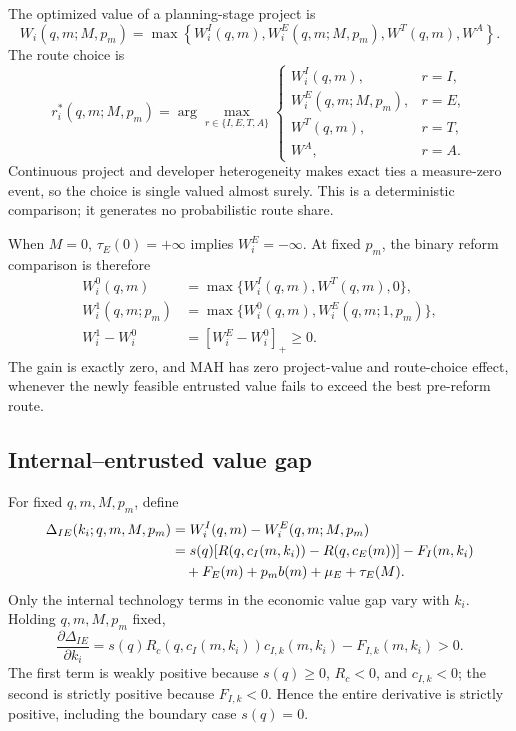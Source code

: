 The optimized value of a planning-stage project is
\begin{equation}
  W_i(q,m;M,p_m)
  =
  \max\left\{
    W_i^I(q,m),
    W_i^E(q,m;M,p_m),
    W^T(q,m),
    W^A
  \right\}.
  \label{eq:p04-optimized-value}
\end{equation}
The route choice is
\begin{equation}
  r_i^*(q,m;M,p_m)
  =
  \arg\max_{r\in\{I,E,T,A\}}
  \begin{cases}
    W_i^I(q,m), & r=I,\\
    W_i^E(q,m;M,p_m), & r=E,\\
    W^T(q,m), & r=T,\\
    W^A, & r=A.
  \end{cases}
  \label{eq:p04-route-choice}
\end{equation}
Continuous project and developer heterogeneity makes exact ties a
measure-zero event, so the choice is single valued almost surely. This is a
deterministic comparison; it generates no probabilistic route share.

When \(M=0\), \(\tau_E(0)=+\infty\) implies
\(W_i^E=-\infty\).
At fixed \(p_m\), the binary reform comparison is therefore
\begin{equation}
  \begin{aligned}
  W_i^0(q,m)
  &=\max\{W_i^I(q,m),W^T(q,m),0\},\\
  W_i^1(q,m;p_m)
  &=\max\{W_i^0(q,m),W_i^E(q,m;1,p_m)\},\\
  W_i^1-W_i^0
  &=[W_i^E-W_i^0]_+\geq0.
  \end{aligned}
  \label{eq:p04-binary-value-effect}
\end{equation}
The gain is exactly zero, and MAH has zero project-value and route-choice
effect, whenever the newly
feasible entrusted value fails to exceed the best pre-reform route.

\subsection{Internal--entrusted value gap}
\label{subsec:p04-value-gap}

For fixed \(q,m,M,p_m\), define
\begin{align}
  \Delta_{IE}(k_i;q,m,M,p_m)
  &=
  W_i^I(q,m)-W_i^E(q,m;M,p_m) \notag\\
  &=
  s(q)\!\left[
    R\!\left(q,c_I(m,k_i)\right)
    -R\!\left(q,c_E(m)\right)
  \right]
  -F_I(m,k_i) \notag\\
  &\quad
  +F_E(m)+p_m b(m)+\mu_E+\tau_E(M).
  \label{eq:p04-value-gap}
\end{align}
Only the internal technology terms in the economic value gap vary with \(k_i\).
Holding \(q,m,M,p_m\) fixed,
\begin{equation}
  \frac{\partial\Delta_{IE}}{\partial k_i}
  =
  s(q)R_c\!\left(q,c_I(m,k_i)\right)c_{I,k}(m,k_i)
  -
  F_{I,k}(m,k_i)
  >0.
  \label{eq:p04-gap-slope}
\end{equation}
The first term is weakly positive because \(s(q)\geq0\),
\(R_c<0\), and \(c_{I,k}<0\); the second is strictly positive because
\(F_{I,k}<0\). Hence the entire derivative is strictly positive, including
the boundary case \(s(q)=0\).

